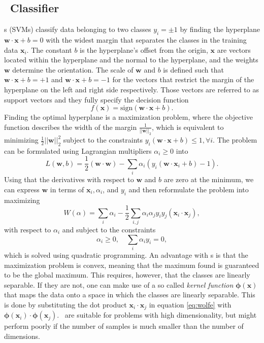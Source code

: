 \subsection{\svm\ Classifier}
\label{sec:theory_svm}
\svm s (SVMs) classify data belonging to two classes $y_i = \pm 1$ by finding the hyperplane $\boldsymbol{w} \cdot \boldsymbol{x} + b = 0$ with the widest margin that separates the classes in the training data $\boldsymbol{x}_i$. The constant $b$ is the hyperplane's offset from the origin, $\boldsymbol{x}$ are vectors located within the hyperplane and the normal to the hyperplane, and the weights $\boldsymbol{w}$ determine the orientation. The scale of $\boldsymbol{w}$ and $b$ is defined such that $\boldsymbol{w} \cdot \boldsymbol{x} + b = +1$ and $\boldsymbol{w} \cdot \boldsymbol{x} + b = -1$ for the vectors that restrict the margin of the hyperplane on the left and right side respectively. Those vectors are referred to as support vectors and they fully specify the decision function
\[
f(\boldsymbol{x}) = \text{sign}(\boldsymbol{w}\cdot \boldsymbol{x} + b).
\]
Finding the optimal hyperplane is a maximization problem, where the objective function describes the width of the margin $\frac{1}{||\boldsymbol{w}||_2}$, which is equivalent to minimizing $\frac{1}{2}||\boldsymbol{w}||_2^2$ subject to the constraints $y_i (\boldsymbol{w}\cdot \boldsymbol{x} + b)\leq 1, \forall i$. The problem can be formulated using Lagrangian multipliers $\alpha_i \geq 0$ into
\[
L(\boldsymbol{w},b) = \frac{1}{2}(\boldsymbol{w} \cdot \boldsymbol{w}) - \sum_i \alpha_i (y_i (\boldsymbol{w} \cdot \boldsymbol{x}_i + b) - 1).
\]
Using that the derivatives with respect to $\boldsymbol{w}$ and $b$ are zero at the minimum, we can express $\boldsymbol{w}$ in terms of $\boldsymbol{x}_i, \alpha_i$, and $y_i$ and then reformulate the problem into maximizing
\begin{equation}
W(\alpha) = \sum_i \alpha_i - \frac{1}{2} \sum_{i,j} \alpha_i \alpha_j y_i y_j (\boldsymbol{x}_i \cdot \boldsymbol{x}_j),
\label{eq:wolfe}
\end{equation}
with respect to $\alpha_i$ and subject to the constraints
\[
\alpha_i \geq 0, \quad \sum_i \alpha_i y_i = 0,
\]
which is solved using quadratic programming. An advantage with \svm s is that the maximization problem is convex, meaning that the maximum found is guaranteed to be the global maximum. This requires, however, that the classes are linearly separable. If they are not, one can make use of a so called \emph{kernel function} $\boldsymbol{\phi}(\boldsymbol{x})$ that maps the data onto a space in which the classes are linearly separable. This is done by substituting the dot product $\boldsymbol{x}_i \cdot \boldsymbol{x}_j$ in equation \eqref{eq:wolfe} with $\boldsymbol{\phi}(\boldsymbol{x}_i) \cdot \boldsymbol{\phi}(\boldsymbol{x}_j)$. \svm\ are suitable for problems with high dimensionality, but might perform poorly if the number of samples is much smaller than the number of dimensions. \cite{Campbell11SVM}
